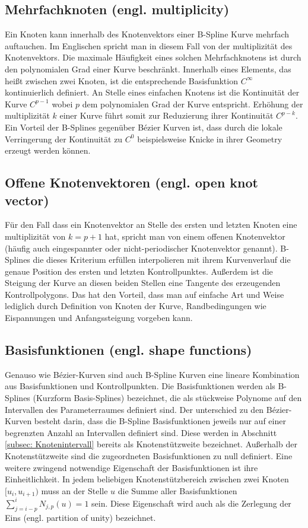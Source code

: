 \documentclass[german,a4paper,12pt,oneside]{scrbook}
\theoremstyle{definition}
\theoremstyle{definition}
\theoremstyle{definition}
\theoremstyle{definition}
\theoremstyle{definition}
\theoremstyle{definition}
\begin{document}
\subsection{Mehrfachknoten (engl. multiplicity)}
Ein Knoten kann innerhalb des Knotenvektors einer B-Spline Kurve mehrfach auftauchen. Im Englischen spricht man in diesem Fall von der multiplizität des Knotenvektors. Die maximale Häufigkeit eines solchen Mehrfachknotens ist durch den polynomialen Grad einer Kurve beschränkt. Innerhalb eines Elements, das heißt zwischen zwei Knoten, ist die entsprechende Basisfunktion $C^{\infty}$ kontinuierlich definiert. An Stelle eines einfachen Knotens ist die Kontinuität der Kurve $C^{p-1}$ wobei $p$ dem polynomialen Grad der Kurve entspricht. Erhöhung der multiplizität $k$ einer Kurve führt somit zur Reduzierung ihrer Kontinuität $C^{p-k}$. Ein Vorteil der B-Splines gegenüber Bézier Kurven ist, dass durch die lokale Verringerung der Kontinuität zu $C^{0}$ beispielsweise Knicke in ihrer Geometry erzeugt werden können.

\subsection{Offene Knotenvektoren (engl. open knot vector)}
Für den Fall dass ein Knotenvektor an Stelle des ersten und letzten Knoten eine multiplizität von $k = p+1$ hat, spricht man von einem offenen Knotenvektor (häufig auch eingespannter oder nicht-periodischer Knotenvektor genannt). B-Splines die dieses Kriterium erfüllen interpolieren mit ihrem Kurvenverlauf die genaue Position des ersten und letzten Kontrollpunktes. Außerdem ist die Steigung der Kurve an diesen beiden Stellen eine Tangente des erzeugenden Kontrollpolygons. Das hat den Vorteil, dass man auf einfache Art und Weise lediglich durch Definition von Knoten der Kurve, Randbedingungen wie Eispannungen und Anfangssteigung vorgeben kann.

\subsection{Basisfunktionen (engl. shape functions)}
Genauso wie Bézier-Kurven sind auch B-Spline Kurven eine lineare Kombination aus Basisfunktionen und Kontrollpunkten. Die Basisfunktionen werden als B-Splines (Kurzform Basis-Splines) bezeichnet, die als stückweise Polynome auf den Intervallen des Parameterraumes definiert sind. Der unterschied zu den Bézier-Kurven besteht darin, dass die B-Spline Basisfunktionen jeweils nur auf einer begrenzten Anzahl an Intervallen definiert sind. Diese werden in Abschnitt \ref{subsec: Knotenintervall} bereits als Knotenstützweite bezeichnet. Außerhalb der Knotenstützweite sind die zugeordneten Basisfunktionen zu null definiert. 
Eine weitere zwingend notwendige Eigenschaft der Basisfunktionen ist ihre Einheitlichkeit. In jedem beliebigen Knotenstützbereich zwischen zwei Knoten $[u_i, u_{i+1})$ muss an der Stelle $u$ die Summe aller Basisfunktionen $\sum^{i}_{j=i-p} {N_{j,p}(u)} = 1$ sein. Diese Eigenschaft wird auch als die Zerlegung der Eins (engl. partition of unity) bezeichnet. 
\end{document}
